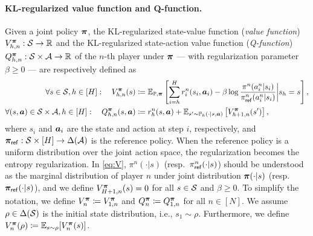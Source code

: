  \paragraph{KL-regularized value function and Q-function.} 
 Given a joint policy ${\bm{\pi}}$, the KL-regularized state-value function (\textit{value function}) $V^{{\bm{\pi}}}_{h,n}: {\mathcal{S}}\rightarrow\mathbb{R}$ and the KL-regularized state-action value function (\textit{Q-function}) $Q^{{\bm{\pi}}}_{h,n}:{\mathcal{S}}\times{\mathcal{A}}\rightarrow\mathbb{R}$ of the $n$-th player under ${\bm{\pi}}$ --- with regularization parameter $\beta\geq 0$ --- are respectively defined as
 \begin{subequations}
 \begin{align}
    \forall s\in{\mathcal{S}}, h\in[H]:\quad V_{h,n}^{{\bm{\pi}}}(s) &\coloneqq \mathbb{E}_{{\mathbb P},{\bm{\pi}}}\left[\sum_{i=h}^H r_i^n(s_i,{\bm{a}}_i)-\beta\log\frac{\pi^n(a_i^n|s_i)}{\pi_{\mathsf{ref}}^n(a_i^n|s_i)}\bigg|s_h=s\right],\label{eq:V}\\
    \forall (s,{\bm{a}})\in{\mathcal{S}}\times{\mathcal{A}}, h\in[H]:\quad Q_{h,n}^{{\bm{\pi}}}(s,{\bm{a}}) &\coloneqq r_h^n(s,{\bm{a}}) +  \mathbb{E}_{s'\sim{\mathbb P}_h(\cdot|s,{\bm{a}})}\left[V_{h+1,n}^{{\bm{\pi}}}(s')\right],\label{eq:Q}
 \end{align}
 \end{subequations}
 where $s_i$ and ${\bm{a}}_i$ are the state and action at step $i$, respectively, and ${\bm{\pi}}_{\mathsf{ref}}:{\mathcal{S}}\times[H]\rightarrow\Delta({\mathcal{A}})$ is the reference policy. When the reference policy is a uniform distribution over the joint action space, the regularization becomes the entropy regularization. 
  In \eqref{eq:V}, $\pi^n(\cdot|s)$ (resp.~$\pi_{\mathsf{ref}}^n(\cdot|s)$) should be understood as the marginal distribution of player $n$ under joint distribution ${\bm{\pi}}(\cdot|s)$ (resp.~${\bm{\pi}}_{\mathsf{ref}}(\cdot|s)$),
 and we define $V_{H+1,n}^{{\bm{\pi}}}(s)=0$ for all $s\in{\mathcal{S}}$ and $\beta\geq 0$. To simplify the notation, we define $V_n^{{\bm{\pi}}}\coloneqq V_{1,n}^{{\bm{\pi}}}$ and $Q_n^{{\bm{\pi}}}\coloneqq Q_{1,n}^{{\bm{\pi}}}$ for all $n\in[N]$.
We assume $\rho\in\Delta({\mathcal{S}})$ is the initial state distribution, i.e., $s_1\sim\rho$. Furthermore, we define $V_n^{\bm{\pi}}(\rho)\coloneqq \mathbb{E}_{s\sim\rho}[V_n^{\bm{\pi}}(s)]$.
 

